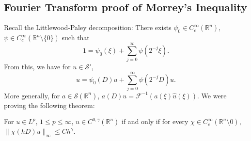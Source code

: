 \documentclass[12pt]{scrartcl}
\newcommand{\R}{\mathbb{R}}
\renewcommand{\hat}{\widehat}
\newcommand{\<}{\langle}
\renewcommand{\>}{\rangle}
\let \mc \mathcal
\begin{document}
\subsection{Fourier Transform proof of Morrey's Inequality}
Recall the Littlewood-Paley decomposition: There exists $\psi_0 \in C_c^\infty(\R^n)$, $\psi \in C_c^\infty(\R^n \setminus \{0\})$ such that $$1 = \psi_0(\xi) + \sum_{j=0}^\infty \psi(2^{-j}\xi).$$  From this, we have for $u \in \mc S'$, 
$$u = \psi_0(D)u + \sum_{j=0}^\infty \psi(2^{-j}D)u.$$
More generally, for $a\in \mc S(\R^n)$, $a(D)u = \mc F^{-1}(a(\xi) \hat{u}(\xi))$.
We were proving the following theorem:
\begin{theorem} For $u \in L^p$, $1\le p \le \infty$, $u \in C^{0, \gamma}(\R^n)$ if and only if for every $\chi \in C_c^\infty(\R^n \setminus 0)$, $\|\chi(hD) u\|_\infty \le C h^{\gamma}$.
\end{theorem}
\end{document}
